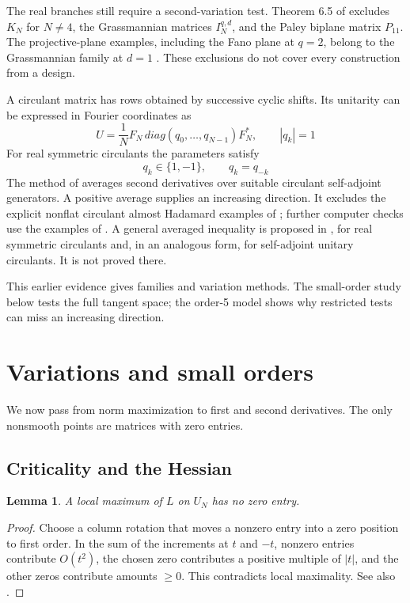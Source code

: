 \documentclass[11pt,a4paper]{article}
\newtheorem{lem}[thm]{Lemma}
\begin{document}
The real branches still require a second-variation test.
Theorem 6.5 of \cite{BN} excludes $K_N$ for $N\ne4$, the Grassmannian
matrices $I_N^{q,d}$, and the Paley biplane matrix $P_{11}$.
The projective-plane examples, including the Fano plane at $q=2$,
belong to the Grassmannian family at $d=1$ \cite[Proposition 5.5]{BN}.
These exclusions do not cover every construction from a design.

A circulant matrix has rows obtained by successive cyclic shifts. Its
unitarity can be expressed in Fourier coordinates as
\[
 U=\frac1N F_N\,diag(q_0,\ldots,q_{N-1})F_N^*,\qquad |q_k|=1
\]
For real symmetric circulants the parameters satisfy
\[
 q_k\in\{1,-1\},\qquad q_k=q_{-k}
\]
The method of \cite[Section 7]{BN} averages second derivatives over
suitable circulant self-adjoint generators. A positive average supplies
an increasing direction. It excludes the explicit nonflat circulant almost
Hadamard examples of \cite{BNZ}; further computer checks use the
examples of \cite{BNp}. A general averaged inequality is proposed in
\cite[Conjecture 7.8]{BN}, for real symmetric circulants and, in an
analogous form, for self-adjoint unitary circulants. It is not proved there.

This earlier evidence gives families and variation methods. The
small-order study below tests the full tangent space; the order-5
model shows why restricted tests can miss an increasing direction.

\section{Variations and small orders}\label{framework}
We now pass from norm maximization to first and second derivatives.
The only nonsmooth points are matrices with zero entries.

\subsection{Criticality and the Hessian}
\begin{lem}\label{fullsupport}
A local maximum of $L$ on $U_N$ has no zero entry.
\end{lem}
\begin{proof}
Choose a column rotation that moves a nonzero entry into a zero
position to first order. In the sum of the increments at $t$ and $-t$,
nonzero entries contribute $O(t^2)$, the chosen zero contributes a
positive multiple of $|t|$, and the other zeros contribute amounts $\ge0$.
This contradicts local maximality. See also \cite[Theorem 1.6]{BN}.
\end{proof}
\end{document}
